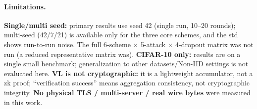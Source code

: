 \documentclass[10pt,conference]{IEEEtran}
\begin{document}
\paragraph{Limitations.} \textbf{Single/multi seed:} primary results use seed 42 (single run, 10--20 rounds); multi-seed (42/7/21) is available only for the three core schemes, and the std shows run-to-run noise. The full 6-scheme $\times$ 5-attack $\times$ 4-dropout matrix was not run (a reduced representative matrix was). \textbf{CIFAR-10 only:} results are on a single small benchmark; generalization to other datasets/Non-IID settings is not evaluated here. \textbf{VL is not cryptographic:} it is a lightweight accumulator, not a zk proof; ``verification success'' means aggregation consistency, not cryptographic integrity. \textbf{No physical TLS / multi-server / real wire bytes} were measured in this work.
\end{document}
